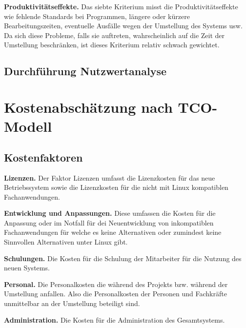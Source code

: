 \documentclass[12pt,utf8]{scrartcl}
\begin{document}
\textbf{Produktivitätseffekte.} Das siebte Kriterium misst die Produktivitätseffekte wie fehlende Standards bei Programmen, längere oder kürzere Bearbeitungszeiten, eventuelle Ausfälle wegen der Umstellung des Systems usw. Da sich diese Probleme, falls sie auftreten, wahrscheinlich auf die Zeit der Umstellung beschränken, ist dieses Kriterium relativ schwach gewichtet. 

\subsection*{Durchführung Nutzwertanalyse}



\newpage
\section*{Kostenabschätzung nach TCO-Modell}

\subsection*{Kostenfaktoren}

\textbf{Lizenzen.} Der Faktor Lizenzen umfasst die Lizenzkosten für das neue Betriebssystem sowie die Lizenzkosten für die nicht mit Linux kompatiblen Fachanwendungen.
\newline

\textbf{Entwicklung und Anpassungen.} Diese umfassen die Kosten für die Anpassung oder im Notfall für dei Neuentwicklung von inkompatiblen Fachanwendungen für welche es keine Alternativen oder zumindest keine Sinnvollen Alternativen unter Linux gibt.
\newline

\textbf{Schulungen.} Die Kosten für die Schulung der Mitarbeiter für die Nutzung des neuen Systems.
\newline

\textbf{Personal.} Die Personalkosten die während des Projekts bzw. während der Umstellung anfallen. Also die Personalkosten der Personen und Fachkräfte unmittelbar an der Umstellung beteiligt sind.
\newline

\textbf{Administration.} Die Kosten für die Administration des Gesamtsystems.
\newline
\end{document}
